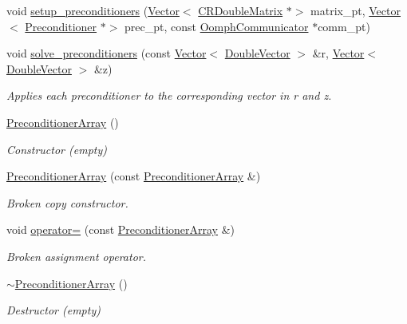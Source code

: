 \begin{DoxyCompactItemize}
\item 
void \hyperlink{classoomph_1_1PreconditionerArray_ac575b5a9fe045dcba7e42aa0c445a7ee}{setup\+\_\+preconditioners} (\hyperlink{classoomph_1_1Vector}{Vector}$<$ \hyperlink{classoomph_1_1CRDoubleMatrix}{C\+R\+Double\+Matrix} $\ast$$>$ matrix\+\_\+pt, \hyperlink{classoomph_1_1Vector}{Vector}$<$ \hyperlink{classoomph_1_1Preconditioner}{Preconditioner} $\ast$$>$ prec\+\_\+pt, const \hyperlink{classoomph_1_1OomphCommunicator}{Oomph\+Communicator} $\ast$comm\+\_\+pt)
\item 
void \hyperlink{classoomph_1_1PreconditionerArray_a11a8bc01a8addffd5212369a2dc72ef7}{solve\+\_\+preconditioners} (const \hyperlink{classoomph_1_1Vector}{Vector}$<$ \hyperlink{classoomph_1_1DoubleVector}{Double\+Vector} $>$ \&r, \hyperlink{classoomph_1_1Vector}{Vector}$<$ \hyperlink{classoomph_1_1DoubleVector}{Double\+Vector} $>$ \&z)
\begin{DoxyCompactList}\small\item\em Applies each preconditioner to the corresponding vector in r and z. \end{DoxyCompactList}\item 
\hyperlink{classoomph_1_1PreconditionerArray_af982432ce1975ed8ba55948fdccb38ba}{Preconditioner\+Array} ()
\begin{DoxyCompactList}\small\item\em Constructor (empty) \end{DoxyCompactList}\item 
\hyperlink{classoomph_1_1PreconditionerArray_a39b7ea03b0a0bdee36546f759f1632b9}{Preconditioner\+Array} (const \hyperlink{classoomph_1_1PreconditionerArray}{Preconditioner\+Array} \&)
\begin{DoxyCompactList}\small\item\em Broken copy constructor. \end{DoxyCompactList}\item 
void \hyperlink{classoomph_1_1PreconditionerArray_a29577eaaaf9055e40e54538ec607dba4}{operator=} (const \hyperlink{classoomph_1_1PreconditionerArray}{Preconditioner\+Array} \&)
\begin{DoxyCompactList}\small\item\em Broken assignment operator. \end{DoxyCompactList}\item 
\hyperlink{classoomph_1_1PreconditionerArray_abb6326ed44c67eff34760bd5944d0cf3}{$\sim$\+Preconditioner\+Array} ()
\begin{DoxyCompactList}\small\item\em Destructor (empty) \end{DoxyCompactList}\item 

\end{DoxyCompactItemize}
